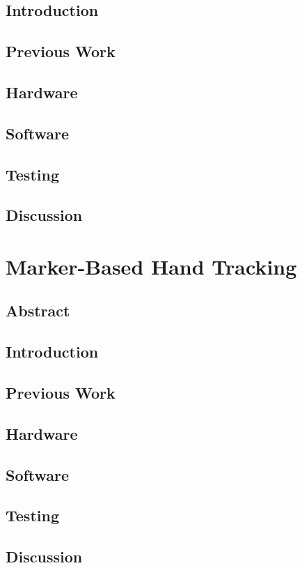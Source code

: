 \documentclass[12pt]{report}	%
\begin{document}
\section{Introduction}
\section{Previous Work}
\section{Hardware}
\section{Software}
\section{Testing}
\section{Discussion}

\chapter{Marker-Based Hand Tracking}
\section{Abstract}
\section{Introduction}
\section{Previous Work}
\section{Hardware}
\section{Software}
\section{Testing}
\section{Discussion}
	
\end{document}
